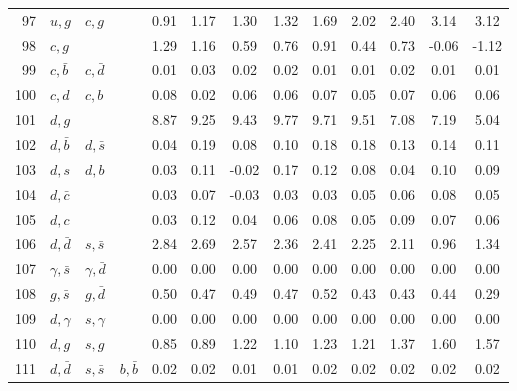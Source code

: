 \begin{tabularx}{\textwidth}{rXXX@{}S@{}S@{}S@{}S@{}S@{}S@{}S@{}S@{}S}
 97 & $u, g$           & $c, g$            &                  &  0.91 &  1.17 &  1.30 &  1.32 &  1.69 &  2.02 &  2.40 &  3.14 &  3.12 \\
 98 & $c, g$           &                   &                  &  1.29 &  1.16 &  0.59 &  0.76 &  0.91 &  0.44 &  0.73 & -0.06 & -1.12 \\
 99 & $c, \bar b$      & $c, \bar d$       &                  &  0.01 &  0.03 &  0.02 &  0.02 &  0.01 &  0.01 &  0.02 &  0.01 &  0.01 \\
100 & $c, d$           & $c, b$            &                  &  0.08 &  0.02 &  0.06 &  0.06 &  0.07 &  0.05 &  0.07 &  0.06 &  0.06 \\
101 & $d, g$           &                   &                  &  8.87 &  9.25 &  9.43 &  9.77 &  9.71 &  9.51 &  7.08 &  7.19 &  5.04 \\
102 & $d, \bar b$      & $d, \bar s$       &                  &  0.04 &  0.19 &  0.08 &  0.10 &  0.18 &  0.18 &  0.13 &  0.14 &  0.11 \\
103 & $d, s$           & $d, b$            &                  &  0.03 &  0.11 & -0.02 &  0.17 &  0.12 &  0.08 &  0.04 &  0.10 &  0.09 \\
104 & $d, \bar c$      &                   &                  &  0.03 &  0.07 & -0.03 &  0.03 &  0.03 &  0.05 &  0.06 &  0.08 &  0.05 \\
105 & $d, c$           &                   &                  &  0.03 &  0.12 &  0.04 &  0.06 &  0.08 &  0.05 &  0.09 &  0.07 &  0.06 \\
106 & $d, \bar d$      & $s, \bar s$       &                  &  2.84 &  2.69 &  2.57 &  2.36 &  2.41 &  2.25 &  2.11 &  0.96 &  1.34 \\
107 & $\gamma, \bar s$ & $\gamma, \bar d$  &                  &  0.00 &  0.00 &  0.00 &  0.00 &  0.00 &  0.00 &  0.00 &  0.00 &  0.00 \\
108 & $g, \bar s$      & $g, \bar d$       &                  &  0.50 &  0.47 &  0.49 &  0.47 &  0.52 &  0.43 &  0.43 &  0.44 &  0.29 \\
109 & $d, \gamma$      & $s, \gamma$       &                  &  0.00 &  0.00 &  0.00 &  0.00 &  0.00 &  0.00 &  0.00 &  0.00 &  0.00 \\
110 & $d, g$           & $s, g$            &                  &  0.85 &  0.89 &  1.22 &  1.10 &  1.23 &  1.21 &  1.37 &  1.60 &  1.57 \\
111 & $d, \bar d$      & $s, \bar s$       & $b, \bar b$      &  0.02 &  0.02 &  0.01 &  0.01 &  0.02 &  0.02 &  0.02 &  0.02 &  0.02 \\

\end{tabularx}
